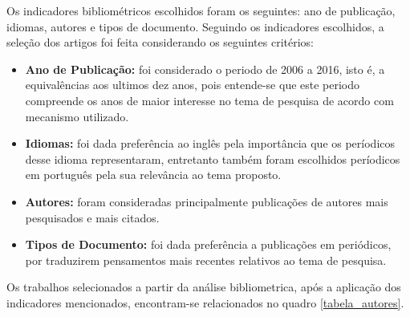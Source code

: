 Os indicadores bibliométricos escolhidos foram os seguintes: ano de publicação, idiomas, autores e tipos de documento. Seguindo os indicadores escolhidos, a seleção dos artigos foi feita considerando os seguintes critérios:

\begin{itemize}
  \item \textbf{Ano de Publicação:} foi considerado o periodo de 2006 a 2016, isto é, a equivalências aos ultimos dez anos, pois entende-se que este periodo compreende os anos de maior interesse no tema de pesquisa de acordo com mecanismo utilizado.
  \item \textbf{Idiomas:} foi dada preferência ao inglês pela importância que os períodicos desse idioma representaram, entretanto também foram escolhidos períodicos em português pela sua relevância ao tema proposto.
  \item \textbf{Autores:} foram consideradas principalmente publicações de autores mais pesquisados e mais citados.
  \item \textbf{Tipos de Documento:} foi dada preferência a publicações em periódicos, por traduzirem pensamentos mais recentes relativos ao tema de pesquisa.
\end{itemize}


Os trabalhos selecionados a partir da análise bibliometrica, após a aplicação dos indicadores mencionados, encontram-se relacionados no quadro \ref{tabela_autores}.

